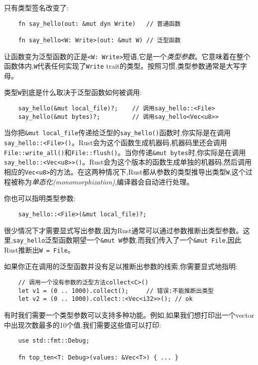 只有类型签名改变了:
\begin{verbatim}
    fn say_hello(out: &mut dyn Write)   // 普通函数

    fn say_hello<W: Write>(out: &mut W) // 泛型函数
\end{verbatim}

让函数变为泛型函数的正是\texttt{<W: Write>}短语,它是一个\emph{类型参数}。它意味着在整个函数体内,\texttt{W}代表任何实现了\texttt{Write} trait的类型。按照习惯,类型参数通常是大写字母。

类型\texttt{W}到底是什么取决于泛型函数如何被调用:
\begin{verbatim}
    say_hello(&mut local_file)?;    // 调用say_hello::<File>
    say_hello(&mut bytes)?;         // 调用say_hello<Vec<u8>>
\end{verbatim}

当你把\texttt{\&mut local\_file}传递给泛型的\texttt{say\_hello()}函数时,你实际是在调用\texttt{say\_hello::<File>()}。Rust会为这个函数生成机器码,机器码里还会调用\texttt{File::write\_all()}和\texttt{File::flush()}。当你传递\texttt{\&mut bytes}时,你实际是在调用\texttt{say\_hello::<Vec<u8>>()}。Rust会为这个版本的函数生成单独的机器码,然后调用相应的\texttt{Vec<u8>}的方法。在这两种情况下,Rust都从参数的类型推导出类型\texttt{W},这个过程被称为\emph{单态化(monomorphization)},编译器会自动进行处理。

你也可以指明类型参数:
\begin{verbatim}
    say_hello::<File>(&mut local_file)?;
\end{verbatim}

很少情况下才需要显式写出参数,因为Rust通常可以通过参数推断出类型参数。这里,\texttt{say\_hello}泛型函数期望一个\texttt{\&mut W}参数,而我们传入了一个\texttt{\&mut File},因此Rust推断出\texttt{W = File}。

如果你正在调用的泛型函数并没有足以推断出参数的线索,你需要显式地指明:
\begin{verbatim}
    // 调用一个没有参数的泛型方法collect<C>()
    let v1 = (0 .. 1000).collect();     // 错误:不能推断出类型
    let v2 = (0 .. 1000).collect::<Vec<i32>>(); // ok
\end{verbatim}

有时我们需要一个类型参数可以支持多种功能。例如,如果我们想打印出一个vector中出现次数最多的10个值,我们需要这些值可以打印:
\begin{verbatim}
    use std::fmt::Debug;

    fn top_ten<T: Debug>(values: &Vec<T>) { ... }
\end{verbatim}

